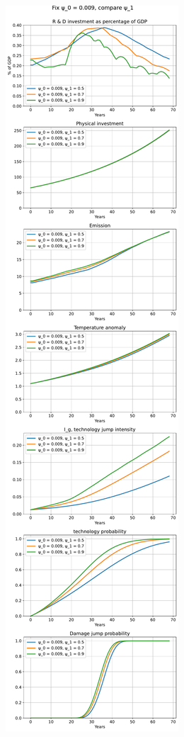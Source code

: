 \documentclass{article}
\begin{document}
	\begin{figure}
	\centering
	\includegraphics{../figures/psi_0_0.009.pdf}
	\end{figure}
\end{document}
